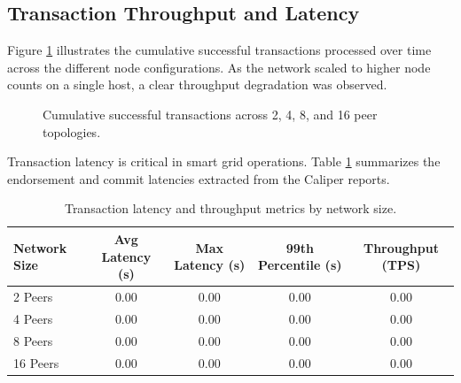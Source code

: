\subsection{Transaction Throughput and Latency}
Figure \ref{fig:cumulative_tps} illustrates the cumulative successful transactions processed over time across the different node configurations. As the network scaled to higher node counts on a single host, a clear throughput degradation was observed.

\begin{figure}[htpb]
    \centering
    \caption{Cumulative successful transactions across 2, 4, 8, and 16 peer topologies.}
    \label{fig:cumulative_tps}
\end{figure}

Transaction latency is critical in smart grid operations. Table \ref{tab:latency_results} summarizes the endorsement and commit latencies extracted from the Caliper reports.

\begin{table}[htpb]
    \centering
    \begin{tabular}{l c c c c}
        \toprule
        \textbf{Network Size} & \textbf{Avg Latency (s)} & \textbf{Max Latency (s)} & \textbf{99th Percentile (s)} & \textbf{Throughput (TPS)} \\
        \midrule
        2 Peers & 0.00 & 0.00 & 0.00 & 0.00 \\ %
        4 Peers & 0.00 & 0.00 & 0.00 & 0.00 \\ %
        8 Peers & 0.00 & 0.00 & 0.00 & 0.00 \\ %
        16 Peers & 0.00 & 0.00 & 0.00 & 0.00 \\ %
        \bottomrule
    \end{tabular}
    \caption{Transaction latency and throughput metrics by network size.}
    \label{tab:latency_results}
\end{table}

